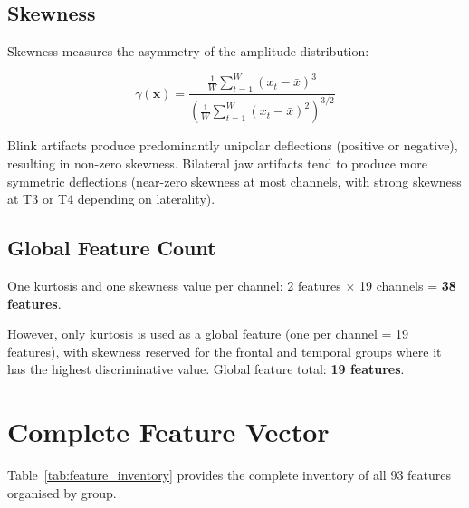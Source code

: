 \subsection{Skewness}

Skewness measures the asymmetry of the amplitude
distribution:

\begin{equation}
\gamma(\mathbf{x}) = \frac{\frac{1}{W}\sum_{t=1}^{W}
(x_t - \bar{x})^3}{\left(\frac{1}{W}\sum_{t=1}^{W}
(x_t - \bar{x})^2\right)^{3/2}}
\label{eq:skewness}
\end{equation}

Blink artifacts produce predominantly unipolar deflections
(positive or negative), resulting in non-zero skewness.
Bilateral jaw artifacts tend to produce more symmetric
deflections (near-zero skewness at most channels, with
strong skewness at T3 or T4 depending on laterality).

\subsection{Global Feature Count}

One kurtosis and one skewness value per channel:
2 features $\times$ 19 channels = \textbf{38 features}.

However, only kurtosis is used as a global feature (one
per channel = 19 features), with skewness reserved for
the frontal and temporal groups where it has the highest
discriminative value. Global feature total: \textbf{19
features}.

\section{Complete Feature Vector}
\label{sec:fe_summary_table}

Table~\ref{tab:feature_inventory} provides the complete
inventory of all 93 features organised by group.

